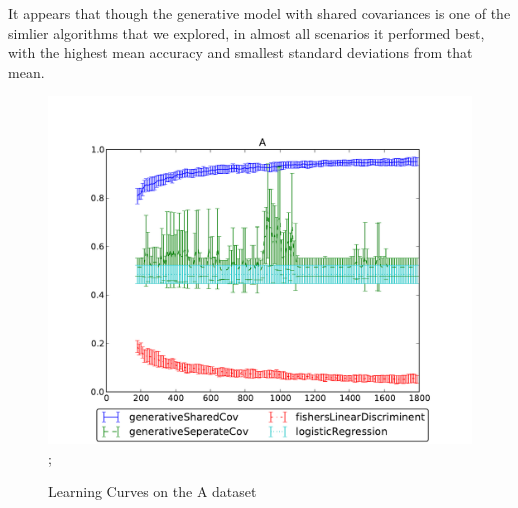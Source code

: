 \documentclass[12pt]{article}
\begin{document}
It appears that though the generative model  with shared covariances is one of the simlier algorithms that we explored, in almost all scenarios it performed best, with the highest mean accuracy and smallest standard deviations from that mean.

\begin{figure}[h]
\centering
\includegraphics[width=.9\textwidth]{A-learning_curve.pdf};
\caption{Learning Curves on the A dataset}
\label{fig:A}
\end{figure}
\end{document}
